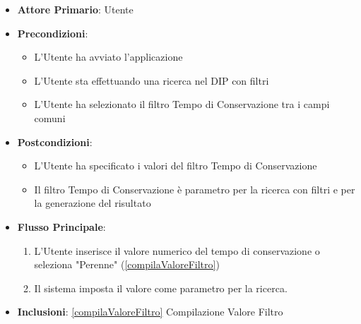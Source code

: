 \begin{itemize}
      \item \textbf{Attore Primario}: Utente
      \item \textbf{Precondizioni}: \begin{itemize}
            \item L'Utente ha avviato l'applicazione
            \item L'Utente sta effettuando una ricerca nel DIP con filtri
            \item L'Utente ha selezionato il filtro Tempo di Conservazione tra i campi comuni
      \end{itemize}
      \item \textbf{Postcondizioni}: \begin{itemize}
            \item L'Utente ha specificato i valori del filtro Tempo di Conservazione
            \item Il filtro Tempo di Conservazione è parametro per la ricerca con filtri e per la generazione del risultato
      \end{itemize}
      \item \textbf{Flusso Principale}:
            \begin{enumerate}
                  \item L'Utente inserisce il valore numerico del tempo di conservazione o seleziona
                        "Perenne" (\ref{compilaValoreFiltro})
                  \item Il sistema imposta il valore come parametro per la ricerca.
            \end{enumerate}
      \item \textbf{Inclusioni}: \ref{compilaValoreFiltro} Compilazione Valore Filtro
\end{itemize}

